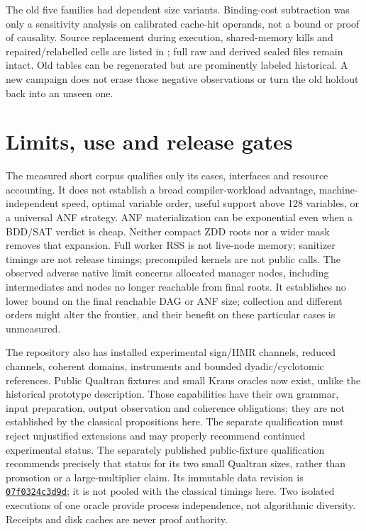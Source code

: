 \documentclass[10pt,a4paper]{article}
\begin{document}
The old five families had dependent size variants. Binding-cost subtraction was only a
sensitivity analysis on calibrated cache-hit operands, not a bound or proof of causality.
Source replacement during execution, shared-memory kills and repaired/relabelled cells are
listed in ; full raw and derived sealed files remain intact.
Old tables can be regenerated but are prominently labeled historical. A new campaign does
not erase those negative observations or turn the old holdout back into an unseen one.

\section{Limits, use and release gates}
The measured short corpus qualifies only its cases, interfaces and resource accounting.
It does not establish a broad compiler-workload advantage, machine-independent speed,
optimal variable order, useful support above 128 variables, or a universal ANF strategy.
ANF materialization can be exponential even when a BDD/SAT verdict is cheap. Neither compact
ZDD roots nor a wider mask removes that expansion. Full worker RSS is not live-node memory;
sanitizer timings are not release timings; precompiled kernels are not public calls.
The observed adverse native limit concerns allocated manager nodes, including intermediates
and nodes no longer reachable from final roots. It establishes no lower bound on the final
reachable DAG or ANF size; collection and different orders might alter the frontier, and
their benefit on these particular cases is unmeasured.

The repository also has installed experimental sign/HMR channels, reduced channels,
coherent domains, instruments and bounded dyadic/cyclotomic references. Public Qualtran
fixtures and small Kraus oracles now exist, unlike the historical prototype description.
Those capabilities have their own grammar, input preparation, output observation and
coherence obligations; they are not established by the classical propositions here. The
separate qualification must reject unjustified extensions and may properly recommend
continued experimental status. The separately published public-fixture qualification
recommends precisely that status for its two small Qualtran sizes, rather than promotion
or a large-multiplier claim. Its immutable data revision is
\href{https://github.com/yoch/symq/commit/07f0324c3d9d1cc2df85ea776f22601ccab87679}{\texttt{07f0324c3d9d}};
it is not pooled with the classical timings here. Two isolated executions of one oracle provide process
independence, not algorithmic diversity. Receipts and disk caches are never proof authority.
\end{document}
